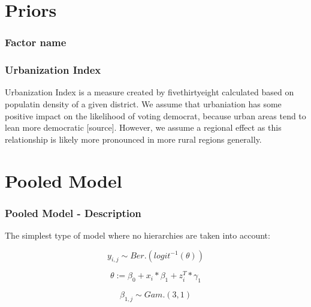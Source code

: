 \documentclass{beamer}
\begin{document}
\section{Priors}

\begin{frame}
  \frametitle{Factor name}


  \end{frame}

\begin{frame}
  \frametitle{Urbanization Index}
  Urbanization Index is a measure created by fivethirtyeight calculated based on populatin density of a given district.
  We assume that urbaniation has some positive impact on the likelihood of voting democrat, because urban areas tend to lean more democratic [source]. 
  However, we assume a regional effect as this relationship is likely more pronounced in more rural regions generally. %
  
  

  \end{frame}


\section{Pooled Model}

\begin{frame}
\frametitle{Pooled Model - Description}

The simplest type of model where no hierarchies are taken into account:

\[y_{i, j} \sim Ber.(logit^{-1}(\theta))\]

\[\theta := \beta_0 + x_{i} * \beta_{1}  + z_{i}^T * \gamma_{1}\]

\[\beta_{1,j} \sim Gam.(3, 1)\]

\end{frame}
\end{document}
